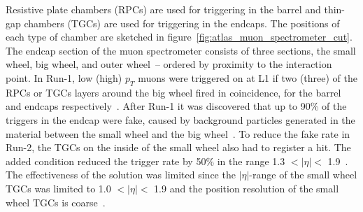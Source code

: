 Resistive plate chambers (RPCs) are used for triggering in the barrel and thin-gap chambers (TGCs) are used for triggering in the endcaps. The positions of each type of chamber are sketched in figure~\ref{fig:atlas_muon_spectrometer_cut}. The endcap section of the muon spectrometer consists of three sections, the small wheel, big wheel, and outer wheel~-- ordered by proximity to the interaction point. In Run-1, low (high) $p_T$ muons were triggered on at L1 if two (three) of the RPCs or TGCs layers around the big wheel fired in coincidence, for the barrel and endcaps respectively~\cite{atlas_l1_trigger_tdr}. After Run-1 it was discovered that up to 90\% of the triggers in the endcap were fake, caused by background particles generated in the material between the small wheel and the big wheel~\cite{nsw_tdr}.  To reduce the fake rate in Run-2, the TGCs on the inside of the small wheel also had to register a hit. The added condition reduced the trigger rate by 50\% in the range 1.3 $< |\eta| <$ 1.9~\cite{martinez_run-2_2016}. The effectiveness of the solution was limited since the $|\eta|$-range of the small wheel TGCs was limited to 1.0 $< |\eta| <$ 1.9 and the position resolution of the small wheel TGCs is coarse~\cite{nsw_tdr}.


